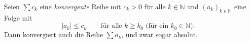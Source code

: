 Seien $\sum c_k$ eine \textit{konvergente} Reihe mit $c_k > 0$ für alle $k \in \mathbb{N}$ und $(a_k)_{k \in \mathbb{N}}$ eine Folge mit
$$|a_k| \leq c_k \qquad \text{für alle $k \geq k_0$ (für ein $k_0 \in \mathbb{N}$).}$$
Dann konvergiert auch die Reihe $\sum a_k$, und zwar sogar absolut.